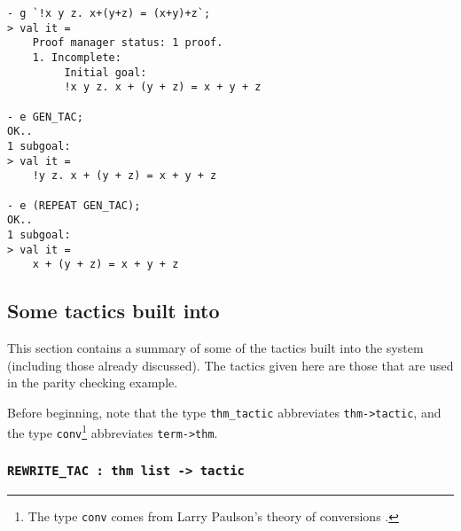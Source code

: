 \begin{session}
\begin{verbatim}
- g `!x y z. x+(y+z) = (x+y)+z`;
> val it =
    Proof manager status: 1 proof.
    1. Incomplete:
         Initial goal:
         !x y z. x + (y + z) = x + y + z

- e GEN_TAC;
OK..
1 subgoal:
> val it =
    !y z. x + (y + z) = x + y + z

- e (REPEAT GEN_TAC);
OK..
1 subgoal:
> val it =
    x + (y + z) = x + y + z
\end{verbatim}
\end{session}

\subsection{Some tactics built into \HOL{}}

This section contains a summary of some of the tactics built into the
\HOL{} system (including those already discussed).  The tactics given
here are those that are used in the parity checking example.

Before beginning, note that the \ML{} type {\small\verb|thm_tactic|}
abbreviates {\small\verb|thm->tactic|}, and the type
{\small\verb|conv|}\footnote{The type {\small{\tt conv}} comes from
Larry Paulson's theory of conversions \cite{lcp_rewrite}.}
abbreviates {\small\verb|term->thm|}.

\subsubsection{\tt REWRITE\_TAC : thm list -> tactic}
\label{rewrite}

